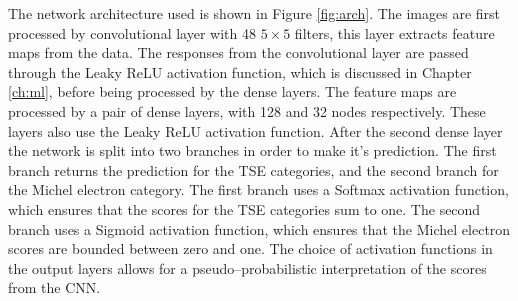 The network architecture used is shown in Figure \ref{fig:arch}. The images
are first processed by convolutional layer with 48 $5 \times 5$ filters, this
layer extracts feature maps from the data. The responses from the 
convolutional layer are passed through the Leaky ReLU activation function, which
is discussed in Chapter \ref{ch:ml}, before being processed by the dense 
layers. The feature maps are processed by a pair of dense layers, with 128 and 
32 nodes respectively. These layers also use the Leaky ReLU activation
function. After the second dense layer the network is split into two branches in
order to make it's prediction. The first branch returns the prediction for the 
TSE categories, and the second branch for the Michel electron category. The 
first branch uses a Softmax activation function, which ensures that the scores 
for the TSE categories sum to one.  The second branch uses a Sigmoid 
activation function, which ensures that the Michel electron scores are bounded 
between zero and one. The choice of activation functions in the output layers 
allows for a pseudo--probabilistic interpretation of the scores from the CNN.

